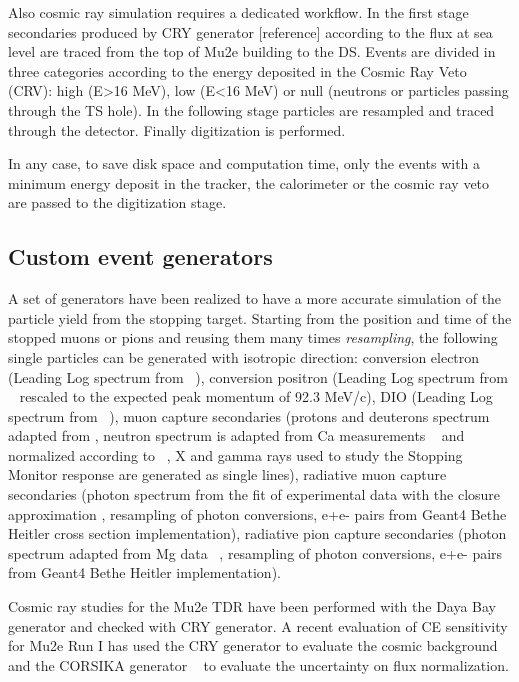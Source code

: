 Also cosmic ray simulation requires a dedicated workflow. In the first stage secondaries produced  by CRY generator [reference] according to the flux at sea level are traced from the top of Mu2e building to the DS. Events are divided in three categories according to the energy deposited in the Cosmic Ray Veto (CRV): high (E>16 MeV), low (E<16 MeV) or null (neutrons or particles passing through the TS hole). In the following stage particles are resampled and traced through the detector. Finally digitization is performed.

In any case, to save disk space and computation time, only the events with a minimum energy deposit in the tracker, the calorimeter or the cosmic ray veto are passed to the digitization stage.


\subsection{ Custom event generators}

A set of generators have been realized to have a more accurate simulation of the particle yield from the stopping target. Starting from the position and time of the stopped muons or pions and reusing them many times {\em resampling}, the following single particles can be generated with isotropic direction: conversion electron (Leading Log spectrum from  ~\cite{Czarnecki:2011mx,Szafron:2017guu}),  conversion positron (Leading Log spectrum from  ~\cite{Czarnecki:2011mx,Szafron:2017guu} rescaled to the expected peak momentum of  92.3 MeV/c), DIO (Leading Log spectrum from ~\cite{Szafron:2016}), muon capture secondaries (protons and deuterons spectrum adapted from \cite{TWIST:2020,ALCAP:2022}, neutron spectrum is adapted from Ca measurements ~\cite{MCnspectrum:1978} and normalized according to ~\cite{MCnnorm:1965}, X and gamma rays used to study the Stopping Monitor response are generated as single lines), radiative muon capture secondaries (photon spectrum from the fit of experimental data \cite{TRIUMF:1999} with the closure approximation \cite{closureapprox}, resampling of photon conversions, e+e- pairs from Geant4 Bethe Heitler cross section implementation), radiative pion capture secondaries  (photon spectrum adapted from Mg data ~\cite{Bistirlich:1972}, resampling of photon conversions, e+e- pairs from Geant4 Bethe Heitler implementation).

Cosmic ray studies for the Mu2e TDR\cite{TDR} have been performed with the Daya Bay generator\cite{DayaBay} and checked with CRY generator\cite{CRY:2007}. A recent evaluation of CE sensitivity  for Mu2e Run I has used the CRY generator to evaluate the cosmic background and the CORSIKA generator ~\cite{CORSIKA:1998} to evaluate the uncertainty on flux normalization.  

